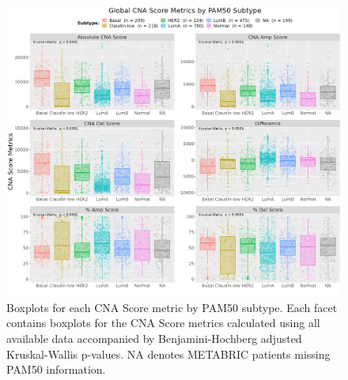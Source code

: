 \vfill
\begin{figure}[!h]
\center
\includegraphics[width=1\textwidth]{../figures/Chapter_2/Global_CNA_Score_Metrics_Across_PAM50.png}
\caption[Boxplots for each CNA Score metric by PAM50 subtype.]{Boxplots for each CNA Score metric by PAM50 subtype. Each facet contains boxplots for the CNA Score metrics calculated using all available data accompanied by Benjamini-Hochberg adjusted Kruskal-Wallis p-values. NA denotes METABRIC patients missing PAM50 information.}
\label{fig:CNA-Score-Metric-Boxplots-P50}
\end{figure}
\vfill

